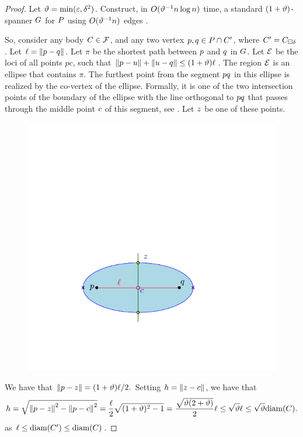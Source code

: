 \documentclass[12pt]{article}%
\begin{document}
\begin{proof}
    Let $\vartheta = \min( \varepsilon, \delta^2)$. Construct, in
    $O(\vartheta^{-1} n \log n)$ time, a standard $(1+\vartheta)$-spanner $G$
    for $P$ using $O( \vartheta^{-1} n)$ edges \cite{ams-dagss-99}.

    So, consider any body $C \in \mathcal{F}$, and any two vertex
    $p, q \in P \cap C'$, where
    $C'=C_{\boxminus \delta}$. Let $\ell = \left\| p - q \right\|$. Let
    $\pi$ be the shortest path between $p$ and $q$ in $G$. Let
    $\mathcal{E}$ be the loci of all points $pc$, such that
    $\left\| p - u \right\| + \left\| u - q \right\| \leq (1+\vartheta) \ell$. The region
    $\mathcal{E}$ is an ellipse that contains $\pi$. The furthest point from
    the segment $pq$ in this ellipse is realized by the co-vertex
    of the ellipse. Formally, it is one of the two intersection points
    of the boundary of the ellipse with the line orthogonal to
    $p q$ that passes through the middle point $c$ of this
    segment, see . Let $z$ be one of these points.

    \begin{figure}[h]
        \centerline{\includegraphics{figs/ellipse}}
        \caption{}
    \end{figure}

    We have that
    \begin{math}
        \left\| p - z \right\| = (1+\vartheta)\ell/2.
    \end{math}
    Setting $h = \left\| z - c \right\|$, we have that
    \begin{equation*}
        h%
        =%
        \sqrt{\dY{\pa}{\pz}^2 - \dY{\pa}{\cen}^2 }
        =%
        \frac{\ell}{2} \sqrt{(1+\epsA)^2 - 1}
        =%
        \frac{\sqrt{\epsA (2+\epsA)}}{2} \ell%
        \leq 
        \sqrt{\epsA} \ell
        \leq 
        \sqrt{\epsA} \diameterX{\body}.
    \end{equation*}
    as $\ell \leq \diameterX{\body'} \leq \diameterX{\body}$.


\end{proof}
\end{document}
